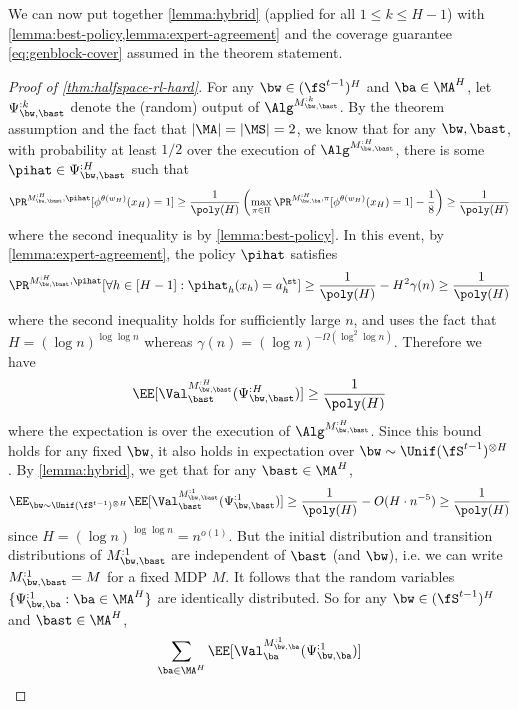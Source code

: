 We can now put together \cref{lemma:hybrid} (applied for all $1 \leq k \leq H-1$) with \cref{lemma:best-policy,lemma:expert-agreement} and the coverage guarantee \cref{eq:genblock-cover} assumed in the theorem statement.
\vspace{1em}
\begin{proof}[Proof of \cref{thm:halfspace-rl-hard}]
For any $\bw \in (\fS^{t-1})^H$ and $\ba \in \MA^H$, let $\Psi^{:k}_{\bw,\bast}$ denote the (random) output of $\Alg^{M^{:k}_{\bw,\bast}}$. By the theorem assumption and the fact that $|\MA|=|\MS|=2$, we know that for any $\bw,\bast$, with probability at least $1/2$ over the execution of $\Alg^{M^{:H}_{\bw,\bast}}$, there is some $\pihat\in \Psi^{:H}_{\bw,\bast}$ such that 
\[\Pr^{M^{:H}_{\bw,\bast},\pihat}[\phi^{\theta(w_H)}(x_H)=1] \geq \frac{1}{\poly(H)}\left(\max_{\pi\in\Pi} \Pr^{M^{:H}_{\bw,\ba},\pi}[\phi^{\theta(w_H)}(x_H)=1] - \frac{1}{8}\right) \geq \frac{1}{\poly(H)}\]
where the second inequality is by \cref{lemma:best-policy}. In this event, by \cref{lemma:expert-agreement}, the policy $\pihat$ satisfies
\[\Pr^{M^{:H}_{\bw,\bast},\pihat}[\forall h \in [H-1]: \pihat_h(x_h) = a^\st_h] \geq \frac{1}{\poly(H)} - H^2 \gamma(n) \geq \frac{1}{\poly(H)}\]
where the second inequality holds for sufficiently large $n$, and uses the fact that $H = (\log n)^{\log \log n}$ whereas $\gamma(n) = (\log n)^{-\Omega(\log^2 \log n)}$.
Therefore we have
\[\EE[\Val^{M^{:H}_{\bw,\bast}}_{\bast}(\Psi^{:H}_{\bw,\bast})] \geq \frac{1}{\poly(H)}\]
where the expectation is over the execution of $\Alg^{M^{:H}_{\bw,\bast}}$.
Since this bound holds for any fixed $\bw$, it also holds in expectation over $\bw \sim \Unif(\fS^{t-1})^{\otimes H}$. By \cref{lemma:hybrid}, we get that for any $\bast \in \MA^H$,
\begin{equation} \EE_{\bw \sim \Unif(\fS^{t-1})^{\otimes H}} \EE[\Val^{M^{:1}_{\bw,\bast}}_{\bast}(\Psi^{:1}_{\bw,\bast})] \geq \frac{1}{\poly(H)} - O(H \cdot n^{-5}) \geq \frac{1}{\poly(H)}
\label{eq:val-lb}
\end{equation}
since $H = (\log n)^{\log \log n} = n^{o(1)}$. But the initial distribution and transition distributions of $M^{:1}_{\bw,\bast}$ are independent of $\bast$ (and $\bw$), i.e. we can write $M^{:1}_{\bw,\bast} = M$ for a fixed MDP $M$. It follows that the random variables $\{\Psi^{:1}_{\bw,\ba}: \ba \in \MA^H\}$ are identically distributed. So for any $\bw \in (\fS^{t-1})^H$ and $\bast \in \MA^H$,
\begin{align*}
\sum_{\ba \in \MA^H} \EE[\Val^{M^{:1}_{\bw,\ba}}_{\ba}(\Psi^{:1}_{\bw,\ba})]

\end{align*}
\end{proof}
